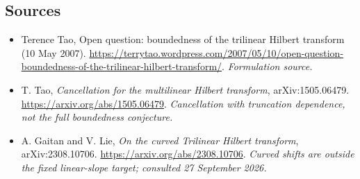 \documentclass[11pt]{article}
\begin{document}
\subsection{Sources}
\begin{itemize}
\item[S1]Terence Tao, Open question: boundedness of the trilinear Hilbert transform (10 May 2007).
\url{https://terrytao.wordpress.com/2007/05/10/open-question-boundedness-of-the-trilinear-hilbert-transform/}.
\textit{Formulation source.}
\item[E1]T. Tao, \emph{Cancellation for the multilinear Hilbert transform}, arXiv:1505.06479.
\url{https://arxiv.org/abs/1505.06479}.
\textit{Cancellation with truncation dependence, not the full boundedness conjecture.}
\item[E2]A. Gaitan and V. Lie, \emph{On the curved Trilinear Hilbert transform}, arXiv:2308.10706.
\url{https://arxiv.org/abs/2308.10706}.
\textit{Curved shifts are outside the fixed linear-slope target; consulted 27 September 2026.}
\end{itemize}
\end{document}
